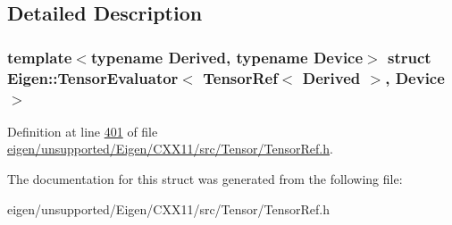 \subsection{Detailed Description}
\subsubsection*{template$<$typename Derived, typename Device$>$\newline
struct Eigen\+::\+Tensor\+Evaluator$<$ Tensor\+Ref$<$ Derived $>$, Device $>$}



Definition at line \hyperlink{eigen_2unsupported_2_eigen_2_c_x_x11_2src_2_tensor_2_tensor_ref_8h_source_l00401}{401} of file \hyperlink{eigen_2unsupported_2_eigen_2_c_x_x11_2src_2_tensor_2_tensor_ref_8h_source}{eigen/unsupported/\+Eigen/\+C\+X\+X11/src/\+Tensor/\+Tensor\+Ref.\+h}.



The documentation for this struct was generated from the following file\+:\begin{DoxyCompactItemize}
\item 
eigen/unsupported/\+Eigen/\+C\+X\+X11/src/\+Tensor/\+Tensor\+Ref.\+h\end{DoxyCompactItemize}
